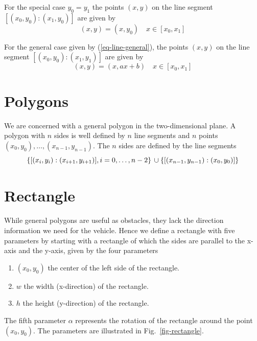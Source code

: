 \documentclass[11pt]{article}
\newcommand{\eqn}[1]{(\ref{#1})}
\newcommand{\figref}[1]{Fig.~\eqref{#1}}
\begin{document}
For the special case $y_0 = y_1$ the points $(x, y)$ on the line segment
$[(x_0, y_0):(x_1, y_0)]$ are given by
\begin{equation}
    (x, y) = (x, y_0)\quad x\in [x_0, x_1]\label{eq-seg-y1y0}
\end{equation}

For the general case given by \eqn{eq-line-general}, the points $(x, y)$ on
the line segment $[(x_0, y_0):(x_1, y_1)]$ are given by
\begin{equation}
    (x, y) = (x, ax + b)\quad x\in [x_0, x_1]\label{eq-seg-general}
\end{equation}

\section{Polygons}
\label{sec-polygons}

We are concerned with a general polygon in the two-dimensional plane. A polygon
with $n$ sides is well defined by $n$ line segments and $n$ points $(x_0,
y_0),\ldots,(x_{n-1}, y_{n-1})$. The $n$ sides are defined by the line segments
\begin{equation}
    \left\{[(x_i, y_i):(x_{i+1}, y_{i+1})], i=0,\ldots,n-2\right\}\\
\cup\left\{[(x_{n-1}, y_{n-1}):(x_{0}, y_{0})]\right\}
\end{equation}

\section{Rectangle}
\label{sec-rectangle}
While general polygons are useful as obstacles, they lack the direction
information we need for the vehicle.  Hence we define a rectangle with five
parameters by starting with a rectangle of which the sides are parallel to
the x-axis and the y-axis, given by the four parameters
\begin{enumerate}
    \item $(x_0, y_0)$ the center of the left side of the rectangle.
    \item $w$ the width (x-direction) of the rectangle.
    \item $h$ the height (y-direction) of the rectangle.
\end{enumerate}
The fifth parameter $\alpha$ represents the rotation of the rectangle around
the point $\left(x_0, y_0\right)$. The parameters are illustrated
in \figref{fig-rectangle}.
\end{document}
